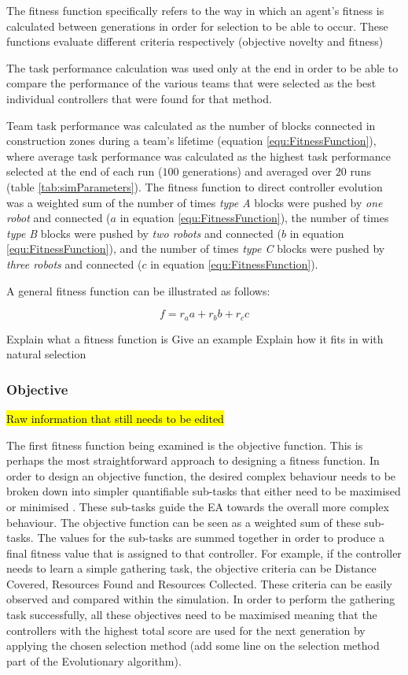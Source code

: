\documentclass[conference]{IEEEtran}
\begin{document}
The fitness function specifically refers to the way in which an agent's fitness is calculated between generations in order for selection to be able to occur. These functions evaluate different criteria respectively (objective novelty and fitness) 

The task performance calculation was used only at the end in order to be able to compare the performance of the various teams that were selected as the best individual controllers that were found for that method.

Team task performance was calculated as the number of blocks connected in construction zones
during a team's lifetime (equation \ref{equ:FitnessFunction}),
where average task performance was calculated as the highest task
performance selected at the end of each run ($100$ generations) and averaged over $20$ runs
(table \ref{tab:simParameters}).
The fitness function to direct controller evolution was a weighted sum of
the number of times \textit{type A} blocks were pushed by \textit{one robot}
and connected (\(a\) in equation \ref{equ:FitnessFunction}), the number of times \textit{type B} blocks were pushed
by \textit{two robots} and connected (\(b\) in equation \ref{equ:FitnessFunction}),
and the number of times \textit{type C} blocks were pushed by \textit{three robots}
and connected (\(c\) in equation \ref{equ:FitnessFunction}).

A general fitness function can be illustrated as follows: 

\begin{equation}\label{equ:FitnessFunction}
f = r_a a + r_b b + r_c c
\end{equation}

Explain what a fitness function is
Give an example
Explain how it fits in with natural selection

\subsubsection{Objective}
\hl{Raw information that still needs to be edited}

The first fitness function being examined is the objective
function. This is perhaps the most straightforward approach
to designing a fitness function.
In order to design an objective function, the desired complex behaviour needs to be broken down into simpler quantifiable sub-tasks that either need to be maximised
or minimised \cite{lehman2011abandoning}. These sub-tasks guide the EA towards
the overall more complex behaviour.
The objective function can be seen as a weighted sum of
these sub-tasks. The values for the sub-tasks are summed
together in order to produce a final fitness value that is assigned to that controller.
For example, if the controller needs to learn a simple gathering task, the objective criteria can be Distance Covered,
Resources Found and Resources Collected. These criteria can be easily observed and compared within the simulation. In order to perform the gathering task successfully, all these objectives need to be maximised meaning that the
controllers with the highest total score are used for the next generation by applying the chosen selection method (add some  line on the selection method part of the Evolutionary algorithm).
\end{document}
